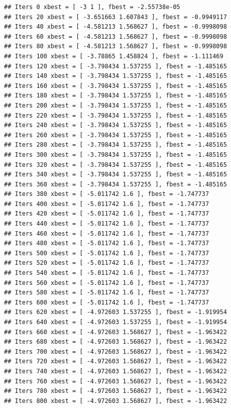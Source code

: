 \documentclass[]{ctexbook}
\begin{document}
\begin{verbatim}
## Iters 0 xbest = [ -3 1 ], fbest = -2.55738e-05 
## Iters 20 xbest = [ -3.651663 1.607843 ], fbest = -0.9949117 
## Iters 40 xbest = [ -4.581213 1.568627 ], fbest = -0.9998098 
## Iters 60 xbest = [ -4.581213 1.568627 ], fbest = -0.9998098 
## Iters 80 xbest = [ -4.581213 1.568627 ], fbest = -0.9998098 
## Iters 100 xbest = [ -3.78865 1.458824 ], fbest = -1.111469 
## Iters 120 xbest = [ -3.798434 1.537255 ], fbest = -1.485165 
## Iters 140 xbest = [ -3.798434 1.537255 ], fbest = -1.485165 
## Iters 160 xbest = [ -3.798434 1.537255 ], fbest = -1.485165 
## Iters 180 xbest = [ -3.798434 1.537255 ], fbest = -1.485165 
## Iters 200 xbest = [ -3.798434 1.537255 ], fbest = -1.485165 
## Iters 220 xbest = [ -3.798434 1.537255 ], fbest = -1.485165 
## Iters 240 xbest = [ -3.798434 1.537255 ], fbest = -1.485165 
## Iters 260 xbest = [ -3.798434 1.537255 ], fbest = -1.485165 
## Iters 280 xbest = [ -3.798434 1.537255 ], fbest = -1.485165 
## Iters 300 xbest = [ -3.798434 1.537255 ], fbest = -1.485165 
## Iters 320 xbest = [ -3.798434 1.537255 ], fbest = -1.485165 
## Iters 340 xbest = [ -3.798434 1.537255 ], fbest = -1.485165 
## Iters 360 xbest = [ -3.798434 1.537255 ], fbest = -1.485165 
## Iters 380 xbest = [ -5.011742 1.6 ], fbest = -1.747737 
## Iters 400 xbest = [ -5.011742 1.6 ], fbest = -1.747737 
## Iters 420 xbest = [ -5.011742 1.6 ], fbest = -1.747737 
## Iters 440 xbest = [ -5.011742 1.6 ], fbest = -1.747737 
## Iters 460 xbest = [ -5.011742 1.6 ], fbest = -1.747737 
## Iters 480 xbest = [ -5.011742 1.6 ], fbest = -1.747737 
## Iters 500 xbest = [ -5.011742 1.6 ], fbest = -1.747737 
## Iters 520 xbest = [ -5.011742 1.6 ], fbest = -1.747737 
## Iters 540 xbest = [ -5.011742 1.6 ], fbest = -1.747737 
## Iters 560 xbest = [ -5.011742 1.6 ], fbest = -1.747737 
## Iters 580 xbest = [ -5.011742 1.6 ], fbest = -1.747737 
## Iters 600 xbest = [ -5.011742 1.6 ], fbest = -1.747737 
## Iters 620 xbest = [ -4.972603 1.537255 ], fbest = -1.919954 
## Iters 640 xbest = [ -4.972603 1.537255 ], fbest = -1.919954 
## Iters 660 xbest = [ -4.972603 1.568627 ], fbest = -1.963422 
## Iters 680 xbest = [ -4.972603 1.568627 ], fbest = -1.963422 
## Iters 700 xbest = [ -4.972603 1.568627 ], fbest = -1.963422 
## Iters 720 xbest = [ -4.972603 1.568627 ], fbest = -1.963422 
## Iters 740 xbest = [ -4.972603 1.568627 ], fbest = -1.963422 
## Iters 760 xbest = [ -4.972603 1.568627 ], fbest = -1.963422 
## Iters 780 xbest = [ -4.972603 1.568627 ], fbest = -1.963422 
## Iters 800 xbest = [ -4.972603 1.568627 ], fbest = -1.963422
\end{verbatim}
\end{document}
